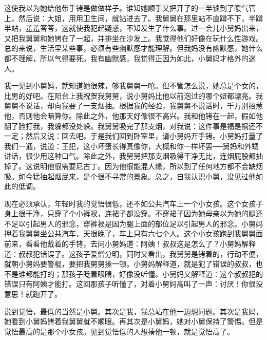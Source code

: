 这使我以为她给他带手铐是做做样子。谁知她顺手又把开了的一半锁到了暖气管上，然后说：大姐，用用卫生间，就钻进去了。我舅舅在那里站不直蹲不下，半蹲半站，羞羞答答，这就使我犯起疑惑，不知发生了什么事。过一会儿小舅妈出来，又把我舅舅和她铐在了一起，并排坐在沙发上。我觉得他们好像在玩什么性游戏。总的来说，生活里某些事，必须有些幽默感才能理解。但我妈没有幽默感，她什么都不理解，所以气得要死。我有幽默感，我觉得正因为如此，小舅妈才格外的迷人。 

我一见到小舅妈，就知道她很辣，够我舅舅一呛。但不管怎么说，她总是个女的，比男的好吧。在阳台上我祝贺我舅舅，说小舅妈比他以前泡过的哪个妞都漂亮。我舅舅不说话，却向我要了一支烟抽。根据我的经验，我舅舅不说话时，千万别招惹他，否则他会暗算你。除此之外，他那天好像很不高兴。我和他铐在一起，假如他翻了脸打我，我躲都没处躲。我舅舅吸完了那支烟，对我说：这件事是福是祸还不一定；然后又说：回去吧。于是我们回到卧室里，请小舅妈开手铐。小舅妈打量了我们一通，说道：王犯，这小坏蛋长得真像你，大概和你一样坏罢──舅妈和外甥讲话，很少用这种口气。除此之外，我舅舅把那支烟吸得干净无比，连烟屁股都抽掉了。这说明他很需要尼古丁。因为他很能混人缘，所以到了任何地方都不会缺烟吸。如今猛抽起烟屁来，是个很不寻常的景象。总之，自我认识小舅，没见过他如此的低调。 

现在必须承认，年轻时我的觉悟很低，还不如公共汽车上一个小女孩。这个女孩子身上很干净，只穿了个小裤衩，连裙子都没穿。不穿裙子因为她母亲以为她的腿还不足以引起男人的邪念，穿裤衩是因为腿上面的部位足以引起男人的邪念。小舅妈押着我舅舅坐公共汽车，天很晚了，车上只有六七个人。这个小女孩跑到我舅舅面前来，看看他戴着的手铐，去问小舅妈道：阿姨！叔叔这是怎么了？小舅妈解释道：叔叔犯错误了。这孩子爱憎分明，同时又看出，我舅舅是铐着的，行动不便，就朝小舅妈要警棍，要把我舅舅揍一顿。小舅妈解释道，就是犯了错误的叔叔，也不是谁都能打的；那孩子眨着眼睛，好像没听懂。小舅妈又解释道：这个叔叔犯的错误只有阿姨才能打。这回那孩子听懂了，对着小舅妈高叫了一声：讨厌！你很没意思！就跑开了。 

说到觉悟，最低的当然是小舅。其次是我，我总站在他一边想问题。其次是我妈，她看到小舅妈铐着我舅舅就不顺眼。再其次是小舅妈，她对小舅保持了警惕。但是觉悟最高的是那个小女孩。见到觉悟低的人想揍他一顿，就是觉悟高了。 

